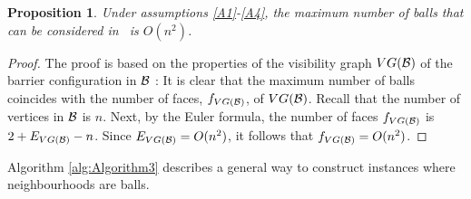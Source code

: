 \documentclass[a4paper,  review, authoryear, 1p., doubleblind]{elsarticle}
\newcommand{\TSPHN}{{\sf{H-TSPHN}\xspace }}
\newtheorem{prop}{Proposition}
\newcommand{\JP}[1]{{\color{armygreen}#1}}
\newcommand{\CV}[1]{{\color{red}#1}}
\begin{document}


\begin{prop}
	Under assumptions \ref{A1}-\ref{A4}, the maximum number of balls that can be considered in \TSPHN \ is $O(n^2)$.
\end{prop}
\begin{proof}
	The proof is based on the properties of the visibility graph $VG(\cal B)$ of the barrier configuration in $\cal B$ \citep{mitchell_shortest_2017}:  It is clear that the maximum number of balls coincides with the number of faces, $f_{VG(\cal B)}$, of $VG(\cal B)$.  Recall that the number of vertices in $\cal B$ is $n$. Next, by the Euler formula, the number of faces $f_{VG(\cal B)}$ is $2+E_{VG(\cal B)}-n$. Since $E_{VG(\cal B)}=O(n^2)$, it follows that $f_{VG(\cal B)}=O(n^2)$.
\end{proof}

Algorithm \ref{alg:Algorithm3} describes a general way to construct instances where neighbourhoods are balls.
\end{document}
